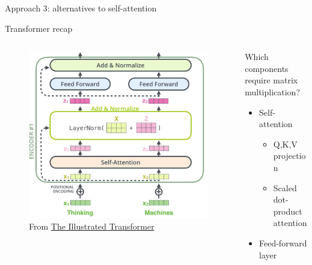 \documentclass[usenames,dvipsnames,notes,11pt,aspectratio=169,hyperref={colorlinks=true, linkcolor=blue}]{beamer}
\begin{document}
\begin{frame}
    {Approach 3: alternatives to self-attention}

    Transformer recap
    \begin{columns}
        \begin{column}{0.4\textwidth}
    \begin{figure}
        \includegraphics[width=\textwidth]{figures/transformer-block}
        \caption{From \href{https://jalammar.github.io/illustrated-transformer}{The Illustrated Transformer}}
    \end{figure}
        \end{column}
        \begin{column}{0.6\textwidth}
            Which components require matrix multiplication?\\
            \pause
            \begin{itemize}
                \item Self-attention 
                    \begin{itemize}
                        \item Q,K,V projection
                        \item Scaled dot-product attention
                    \end{itemize}
                \item Feed-forward layer
            \end{itemize}
        \end{column}
    \end{columns}
\end{frame}
\end{document}
